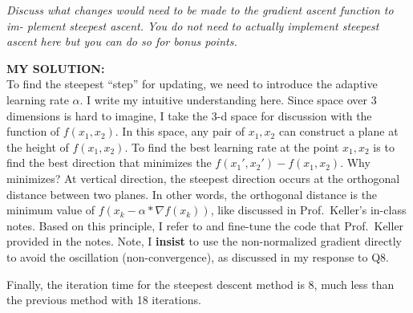 \documentclass[
]{article}
\begin{document}
\emph{Discuss what changes would need to be made to the gradient ascent
function to im- plement steepest ascent. You do not need to actually
implement steepest ascent here but you can do so for bonus points.}

\textbf{MY SOLUTION:}\\
To find the steepest ``step'' for updating, we need to introduce the
adaptive learning rate \(\alpha\). I write my intuitive understanding
here. Since space over 3 dimensions is hard to imagine, I take the 3-d
space for discussion with the function of \(f(x_1,x_2)\). In this space,
any pair of \(x_1, x_2\) can construct a plane at the height of
\(f(x_1,x_2)\). To find the best learning rate at the point \(x_1, x_2\)
is to find the best direction that minimizes the
\(f(x_1',x_2')-f(x_1,x_2)\). Why minimizes? At vertical direction, the
steepest direction occurs at the orthogonal distance between two planes.
In other words, the orthogonal distance is the minimum value of
\(f(x_k-\alpha*\nabla f(x_k))\), like discussed in Prof.~Keller's
in-class notes. Based on this principle, I refer to and fine-tune the
code that Prof.~Keller provided in the notes. Note, I \textbf{insist} to
use the non-normalized gradient directly to avoid the oscillation
(non-convergence), as discussed in my response to Q8.

Finally, the iteration time for the steepest descent method is 8, much
less than the previous method with 18 iterations.
\end{document}

